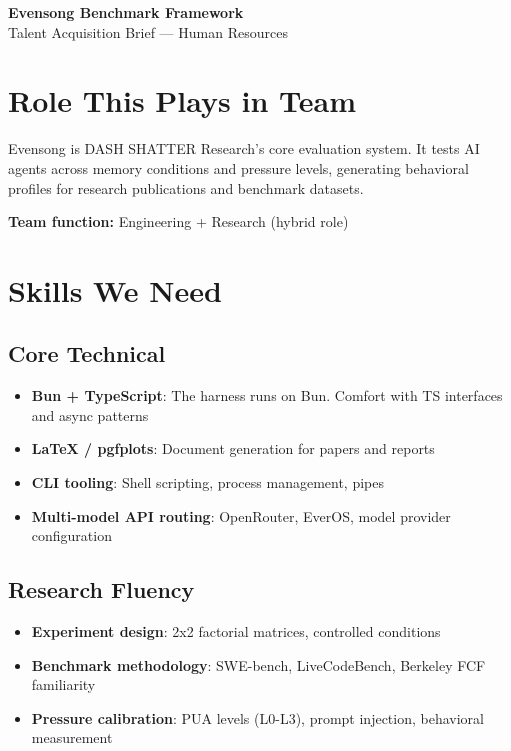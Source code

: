 \documentclass[11pt,a4paper]{article}
\begin{document}
\begin{center}
{\fontsize{22pt}{28pt}\selectfont\sffamily\bfseries\color{deep}Evensong Benchmark Framework}\\
{\fontsize{11pt}{14pt}\selectfont\sffamily\color{gray}Talent Acquisition Brief — Human Resources}
\end{center}
\vspace{2mm}{\color{deep}\rule{\textwidth}{0.5pt}}\vspace{2mm}

\section{Role This Plays in Team}

Evensong is DASH SHATTER Research's core evaluation system. It tests AI agents across memory conditions and pressure levels, generating behavioral profiles for research publications and benchmark datasets.

\textbf{Team function:} Engineering + Research (hybrid role)

\section{Skills We Need}

\subsection*{Core Technical}
\begin{itemize}
  \item \textbf{Bun + TypeScript}: The harness runs on Bun. Comfort with TS interfaces and async patterns
  \item \textbf{LaTeX / pgfplots}: Document generation for papers and reports
  \item \textbf{CLI tooling}: Shell scripting, process management, pipes
  \item \textbf{Multi-model API routing}: OpenRouter, EverOS, model provider configuration
\end{itemize}

\subsection*{Research Fluency}
\begin{itemize}
  \item \textbf{Experiment design}: 2x2 factorial matrices, controlled conditions
  \item \textbf{Benchmark methodology}: SWE-bench, LiveCodeBench, Berkeley FCF familiarity
  \item \textbf{Pressure calibration}: PUA levels (L0-L3), prompt injection, behavioral measurement
\end{itemize}
\end{document}
